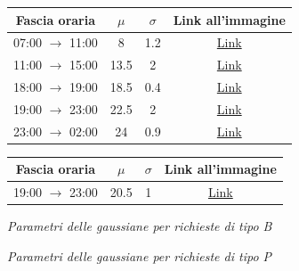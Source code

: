 \documentclass[a4paper, 12pt]{article}
\begin{document}
\begin{minipage}{0.45\textwidth}
\begin{table}[H]
\centering
\begin{tabular}{ |c|c|c|c| }
	\hline
    \cellcolor{cellcolor} Fascia oraria & \cellcolor{cellcolor}$\mu$ & \cellcolor{cellcolor}$\sigma$ & \cellcolor{cellcolor}Link all'immagine\\
	\hline
    \hline

  	07:00 $\rightarrow$ 11:00 & 8 & 1.2 & \hyperlink{distribuzione gaussiana 7-11}{Link}\\
    \hline	
	
	11:00 $\rightarrow$ 15:00 & 13.5 & 2 & \hyperlink{distribuzione gaussiana 11-15}{Link}\\
    \hline
  
	18:00 $\rightarrow$ 19:00 & 18.5 & 0.4 & \hyperlink{distribuzione gaussiana 18-19}{Link}\\   
    \hline
    
	19:00 $\rightarrow$ 23:00 & 22.5 & 2 & \hyperlink{distribuzione gaussiana 19-23}{Link}\\
    \hline
    
    23:00 $\rightarrow$ 02:00 & 24 & 0.9 & \hyperlink{distribuzione gaussiana 23-26}{Link}\\ 
    \hline        
\end{tabular}
\end{table}
\end{minipage}
\hspace{0.1\textwidth}
\begin{minipage}{0.45\textwidth}
\begin{table}[H]
\centering
\begin{tabular}{ |c|c|c|c| }
	\hline
    \cellcolor{cellcolor} Fascia oraria & \cellcolor{cellcolor}$\mu$ & \cellcolor{cellcolor}$\sigma$ & \cellcolor{cellcolor}Link all'immagine\\
	\hline
    \hline
    19:00 $\rightarrow$ 23:00 & 20.5 & 1 & \hyperlink{distribuzione gaussiana P}{Link}\\
    \hline
\end{tabular}
\end{table}
\end{minipage}
\bigskip

\begin{minipage}{0.45\textwidth}
\centering
\textit{Parametri delle gaussiane per richieste di tipo B}
\end{minipage}
\hspace{0.1\textwidth}
\begin{minipage}{0.45\textwidth}
\centering
\textit{Parametri delle gaussiane per richieste di tipo P}
\end{minipage}
\bigskip
\end{document}
